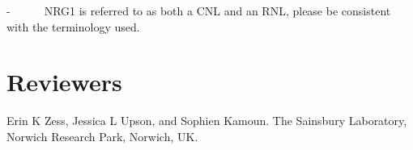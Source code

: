 \documentclass[10pt]{article}
\begin{document}
-~~~~~~NRG1 is referred to as both a CNL and an RNL, please be
consistent with the terminology used.~

\par\null

\section*{Reviewers}

{\label{924286}}\par\null

Erin K Zess, Jessica L Upson, and Sophien Kamoun. The Sainsbury
Laboratory, Norwich Research Park, Norwich, UK.

\FloatBarrier


\end{document}
